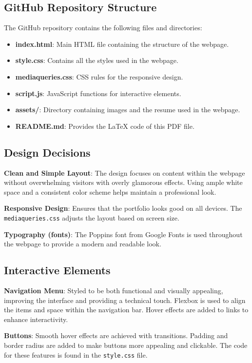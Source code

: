 \documentclass{article}
\begin{document}
\subsection*{GitHub Repository Structure}
The GitHub repository contains the following files and directories:
\begin{itemize}
    \item \textbf{index.html}: Main HTML file containing the structure of the webpage.
    \item \textbf{style.css}: Contains all the styles used in the webpage.
    \item \textbf{mediaqueries.css}: CSS rules for the responsive design.
    \item \textbf{script.js}: JavaScript functions for interactive elements.
    \item \textbf{assets/}: Directory containing images and the resume used in the webpage.
    \item \textbf{README.md}: Provides the LaTeX code of this PDF file.
\end{itemize}

\subsection*{Design Decisions}
\textbf{Clean and Simple Layout}: The design focuses on content within the webpage without overwhelming visitors with overly glamorous effects. Using ample white space and a consistent color scheme helps maintain a professional look.

\textbf{Responsive Design}: Ensures that the portfolio looks good on all devices. The \texttt{mediaqueries.css} adjusts the layout based on screen size.

\textbf{Typography (fonts)}: The Poppins font from Google Fonts is used throughout the webpage to provide a modern and readable look.

\subsection*{Interactive Elements}
\textbf{Navigation Menu}: Styled to be both functional and visually appealing, improving the interface and providing a technical touch. Flexbox is used to align the items and space within the navigation bar. Hover effects are added to links to enhance interactivity.

\textbf{Buttons}: Smooth hover effects are achieved with transitions. Padding and border radius are added to make buttons more appealing and clickable. The code for these features is found in the \texttt{style.css} file.
\end{document}
